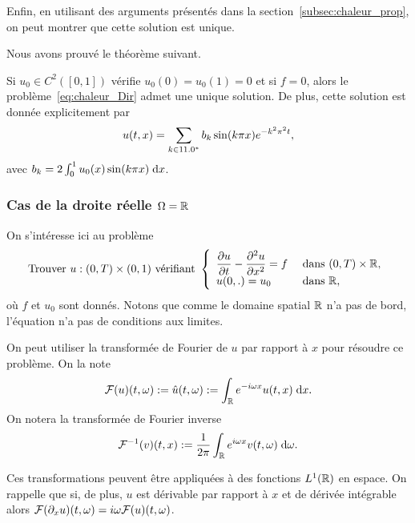 \documentclass[12pt,a4paper,twoside]{article}
\begin{document}
Enfin, en utilisant des arguments pr\'esent\'es dans la section~\ref{subsec:chaleur_prop},
on peut montrer que cette solution est unique.

Nous avons prouv\'e le th\'eor\`eme suivant.
\begin{theorem}
  Si $u_0 \in C^2([0,1])$ v\'erifie $u_0(0) = u_0(1) = 0$ et si $f=0$,
  alors le probl\`eme~\eqref{eq:chaleur_Dir} admet une unique solution.
  De plus, cette solution est donn\'ee explicitement par
  \begin{align*}
    u(t,x) = \sum_{k\in11.0^*} b_k \sin(k \pi x) e^{- k^2 \pi^2 t} ,
  \end{align*}
  avec
  $b_k = 2 \int_{0}^1 u_0(x) \sin(k \pi x) \;\mathrm{d} x$.
\end{theorem}




\subsubsection{Cas de la droite r\'eelle $\Omega = \mathbb{R}$}
\label{subsubsec:chaleur_R}


On s'int\'eresse ici au probl\`eme
\begin{equation}
  \label{eq:chaleur_R}
  \text{Trouver $u : (0,T) \times (0,1) $ v\'erifiant  }
  \left\{
    \begin{array}{l l}
      \dfrac{\partial u}{\partial t} - \dfrac{\partial^2 u}{\partial x^2} = f 
      &\text{ dans } (0,T) \times \mathbb{R} ,
      \\
      u(0,.) = u_0 
      & \text{ dans } \mathbb{R} ,
    \end{array}
  \right.
\end{equation}
o\`u $f$ et $u_0$ sont donn\'es.
Notons que comme le domaine spatial $\mathbb{R}$ n'a pas de bord, l'\'equation 
n'a pas de conditions aux limites.


On peut utiliser la transform\'ee de Fourier de $u$ par rapport \`a $x$ 
pour r\'esoudre ce probl\`eme. On la note
\begin{align*}
  \mathcal{F}(u)(t,\omega) := \hat u(t,\omega) := \int_{\mathbb{R}} e^{- i \omega x} u(t,x) \;\mathrm{d} x .
\end{align*}
On notera la transform\'ee de Fourier inverse
\begin{align*}
  \mathcal{F}^{-1}(v)(t,x) := \dfrac{1}{2\pi} \int_{\mathbb{R}} e^{i \omega x} v(t,\omega) \;\mathrm{d} \omega .
\end{align*}

Ces transformations peuvent \^etre appliqu\'ees \`a des fonctions $L^1(\mathbb{R})$ en espace.
On rappelle que si, de plus, $u$ est d\'erivable par rapport \`a $x$ et de d\'eriv\'ee
int\'egrable alors $\mathcal{F}(\partial_x u)(t,\omega) = i \omega \mathcal{F}(u)(t,\omega)$.
\end{document}
